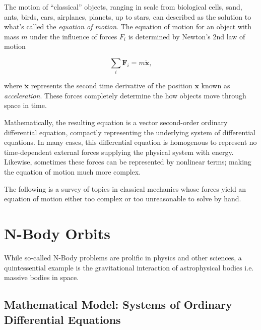 \documentclass{report}
\begin{document}
    The motion of ``classical'' objects, ranging in scale from biological cells, sand, ants, birds, cars, airplanes, planets, up to stars, can described as the solution to what's called the \emph{equation of motion}.  The equation of motion for an object with mass $m$ under the influence of forces $F_i$ is determined by Newton's 2nd law of motion
    
    \begin{equation} \label{eq:newton}
        \sum_i \mathbf{F}_i = m \ddot{\mathbf{x}},
    \end{equation}

    where $\ddot{\mathbf{x}}$ represents the second time derivative of the position $\mathbf{x}$ known as \emph{acceleration}.  These forces completely determine the how objects move through space in time.
    
    Mathematically, the resulting equation is a vector second-order ordinary differential equation, compactly representing the underlying system of differential equations.  In many cases, this differential equation is homogenous to represent no time-dependent external forces supplying the physical system with energy.  Likewise, sometimes these forces can be represented by nonlinear terms; making the equation of motion much more complex.
    
    The following is a survey of topics in classical mechanics whose forces yield an equation of motion either too complex or too unreasonable to solve by hand.

\pagebreak

    \section{N-Body Orbits} \label{subsec:orbits}

        While so-called N-Body problems are prolific in physics and other sciences, a quintessential example is the gravitational interaction of astrophysical bodies i.e. massive bodies in space.

        \subsection{Mathematical Model: Systems of Ordinary Differential Equations}
\end{document}
